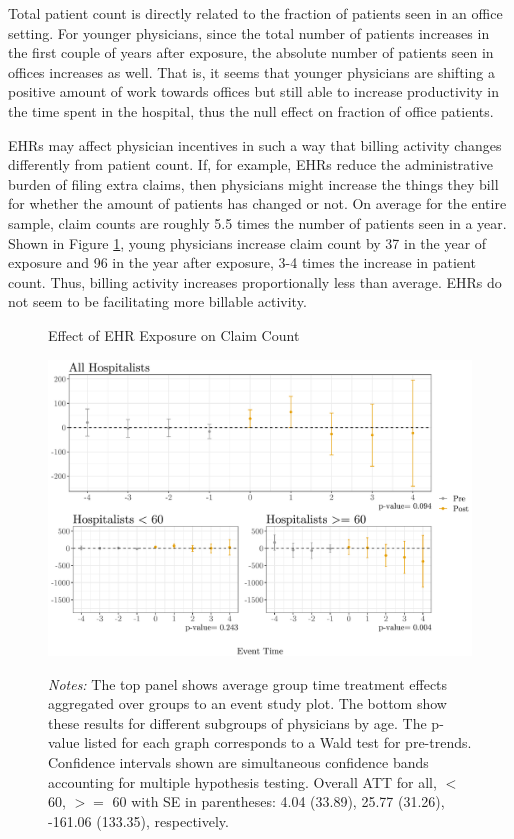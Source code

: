 \documentclass[11pt]{article}
\begin{document}
Total patient count is directly related to the fraction of patients seen in an office setting. For younger physicians, since the total number of patients increases in the first couple of years after exposure, the absolute number of patients seen in offices increases as well. That is, it seems that younger physicians are shifting a positive amount of work towards offices but still able to increase productivity in the time spent in the hospital, thus the null effect on fraction of office patients. 

EHRs may affect physician incentives in such a way that billing activity changes differently from patient count. If, for example, EHRs reduce the administrative burden of filing extra claims, then physicians might increase the things they bill for whether the amount of patients has changed or not. On average for the entire sample, claim counts are roughly 5.5 times the number of patients seen in a year. Shown in Figure \ref{fig:claim}, young physicians increase claim count by 37 in the year of exposure and 96 in the year after exposure, 3-4 times the increase in patient count. Thus, billing activity increases proportionally less than average. EHRs do not seem to be facilitating more billable activity. 

\begin{figure}[ht]
    \centering
    \captionsetup{width=.85\linewidth}
    \caption{Effect of EHR Exposure on Claim Count}
    \includegraphics[scale=.65]{Objects/claim_plot.pdf}
    \label{fig:claim}
    \vspace{2mm}
    \caption*{\footnotesize{\textit{Notes:} The top panel shows average group time treatment effects aggregated over groups to an event study plot. The bottom show these results for different subgroups of physicians by age. The p-value listed for each graph corresponds to a Wald test for pre-trends. Confidence intervals shown are simultaneous confidence bands accounting for multiple hypothesis testing. Overall ATT for all, $<$ 60, $>=$ 60 with SE in parentheses: 4.04 (33.89), 25.77 (31.26), -161.06 (133.35), respectively.}}
\end{figure}
\end{document}
